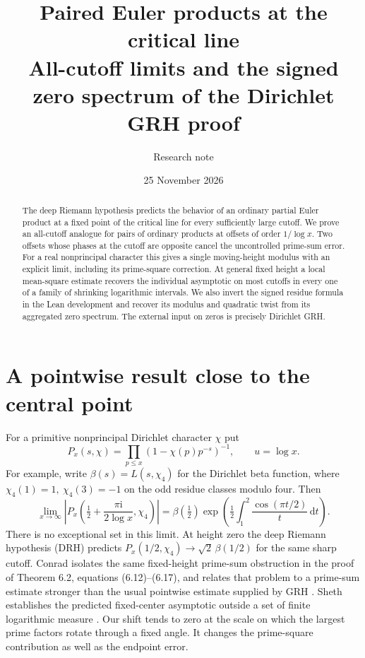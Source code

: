 \documentclass[11pt]{article}
\title{Paired Euler products at the critical line\\[2pt]
\large All-cutoff limits and the signed zero spectrum of the Dirichlet GRH proof}
\author{Research note}\date{25 November 2026}
\newcommand{\dd}{\,\mathrm d}
\newcommand{\ii}{\mathrm i}
\begin{document}
\maketitle
\begin{abstract}
The deep Riemann hypothesis predicts the behavior of an ordinary partial Euler product at a fixed point of the critical line for every sufficiently large cutoff. We prove an all-cutoff analogue for pairs of ordinary products at offsets of order $1/\log x$. Two offsets whose phases at the cutoff are opposite cancel the uncontrolled prime-sum error. For a real nonprincipal character this gives a single moving-height modulus with an explicit limit, including its prime-square correction. At general fixed height a local mean-square estimate recovers the individual asymptotic on most cutoffs in every one of a family of shrinking logarithmic intervals. We also invert the signed residue formula in the Lean development and recover its modulus and quadratic twist from its aggregated zero spectrum. The external input on zeros is precisely Dirichlet GRH.
\end{abstract}

\section{A pointwise result close to the central point}
For a primitive nonprincipal Dirichlet character $\chi$ put
\[
 P_x(s,\chi)=\prod_{p\le x}(1-\chi(p)p^{-s})^{-1},\qquad u=\log x.
\]
For example, write $\beta(s)=L(s,\chi_4)$ for the Dirichlet beta function,
where $\chi_4(1)=1,\ \chi_4(3)=-1$ on the odd residue classes modulo four. Then
\begin{equation}\label{eq:beta}
 \lim_{x\to\infty}\left|P_x\!\left(\tfrac12+\frac{\pi\ii}{2\log x},\chi_4\right)\right|
 =\beta(\tfrac12)\exp\!\left(\tfrac12\int_1^2\frac{\cos(\pi t/2)}{t}\dd t\right).
\end{equation}
There is no exceptional set in this limit. At height zero the deep Riemann hypothesis (DRH) predicts $P_x(1/2,\chi_4)\to\sqrt{2}\,\beta(1/2)$ for the same sharp cutoff. Conrad isolates the same fixed-height prime-sum obstruction in the proof of Theorem 6.2, equations (6.12)--(6.17), and relates that problem to a prime-sum estimate stronger than the usual pointwise estimate supplied by GRH \cite{conrad,kaneko}. Sheth establishes the predicted fixed-center asymptotic outside a set of finite logarithmic measure \cite{sheth}. Our shift tends to zero at the scale on which the largest prime factors rotate through a fixed angle. It changes the prime-square contribution as well as the endpoint error.
\end{document}
